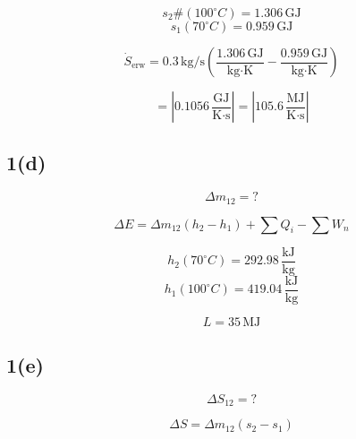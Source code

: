 \begin{equation*}
s_2 \# (100^\circ C) = 1.306 \, \text{GJ}
\end{equation*}
\begin{equation*}
s_1 (70^\circ C) = 0.959 \, \text{GJ}
\end{equation*}

\begin{equation*}
\dot{S}_{\text{erw}} = 0.3 \, \text{kg/s} \left( \frac{1.306 \, \text{GJ}}{\text{kg} \cdot \text{K}} - \frac{0.959 \, \text{GJ}}{\text{kg} \cdot \text{K}} \right)
\end{equation*}

\begin{equation*}
= \left| 0.1056 \, \frac{\text{GJ}}{\text{K} \cdot \text{s}} \right| = \left| 105.6 \, \frac{\text{MJ}}{\text{K} \cdot \text{s}} \right|
\end{equation*}

\subsection*{1(d)}
\begin{equation*}
\Delta m_{12} = ?
\end{equation*}


\begin{equation*}
\Delta E = \Delta m_{12} (h_2 - h_1) + \sum Q_i - \sum W_n
\end{equation*}

\begin{equation*}
h_2 (70^\circ C) = \boxed{292.98 \, \frac{\text{kJ}}{\text{kg}}}
\end{equation*}
\begin{equation*}
h_1 (100^\circ C) = \boxed{419.04 \, \frac{\text{kJ}}{\text{kg}}}
\end{equation*}

\begin{equation*}
L = 35 \, \text{MJ}
\end{equation*}

\subsection*{1(e)}
\begin{equation*}
\Delta S_{12} = ?
\end{equation*}

\begin{equation*}
\Delta S = \Delta m_{12} (s_2 - s_1)
\end{equation*}

